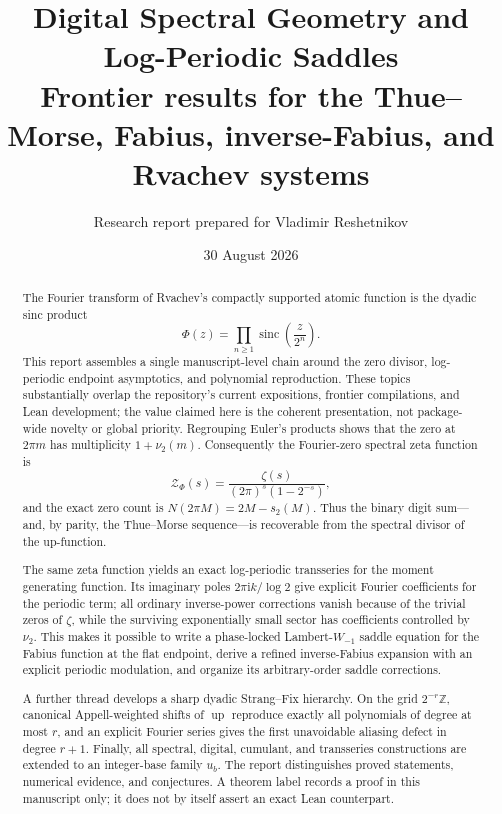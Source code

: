 \documentclass[11pt,oneside]{article}
\title{\bfseries Digital Spectral Geometry and Log-Periodic Saddles\\[0.35em]
\large Frontier results for the Thue--Morse, Fabius, inverse-Fabius,
and Rvachev systems}
\author{Research report prepared for Vladimir Reshetnikov}
\date{30 August 2026}
\theoremstyle{definition}
\theoremstyle{remark}
\newcommand{\Z}{\mathbb Z}
\newcommand{\Up}{\operatorname{up}}
\newcommand{\sinc}{\operatorname{sinc}}
\newcommand{\ii}{\mathrm i}
\begin{document}
\maketitle

\begin{abstract}
The Fourier transform of Rvachev's compactly supported atomic function is the
dyadic sinc product
\[
 \Phi(z)=\prod_{n\geq1}\sinc\!\left(\frac{z}{2^n}\right).
\]
This report assembles a single manuscript-level chain around the zero divisor,
log-periodic endpoint asymptotics, and polynomial reproduction.  These topics
substantially overlap the repository's current expositions, frontier
compilations, and Lean development; the value claimed here is the coherent
presentation, not package-wide novelty or global priority.  Regrouping
Euler's products shows that the zero at \(2\pi m\) has multiplicity
\(1+\nu_2(m)\).  Consequently the Fourier-zero spectral zeta function is
\[
 \mathcal Z_\Phi(s)
 =\frac{\zeta(s)}{(2\pi)^s(1-2^{-s})},
\]
and the exact zero count is \(N(2\pi M)=2M-s_2(M)\).  Thus the binary digit
sum---and, by parity, the Thue--Morse sequence---is recoverable from the
spectral divisor of the up-function.

The same zeta function yields an exact log-periodic transseries for the moment
generating function.  Its imaginary poles
\(2\pi\ii k/\log2\) give explicit Fourier coefficients for the periodic term;
all ordinary inverse-power corrections vanish because of the trivial zeros of
\(\zeta\), while the surviving exponentially small sector has coefficients
controlled by \(\nu_2\).  This makes it possible to write a phase-locked
Lambert-\(W_{-1}\) saddle equation for the Fabius function at the flat endpoint,
derive a refined inverse-Fabius expansion with an explicit periodic
modulation, and organize its arbitrary-order saddle corrections.

A further thread develops a sharp dyadic Strang--Fix hierarchy.  On the grid
\(2^{-r}\Z\), canonical Appell-weighted shifts of \(\Up\) reproduce exactly
all polynomials of degree at most \(r\), and an explicit Fourier series gives
the first unavoidable aliasing defect in degree \(r+1\).  Finally, all spectral,
digital, cumulant, and transseries constructions are extended to an
integer-base family \(u_b\).  The report distinguishes proved statements,
numerical evidence, and conjectures.  A theorem label records a proof in this
manuscript only; it does not by itself assert an exact Lean counterpart.
\end{abstract}
\end{document}
